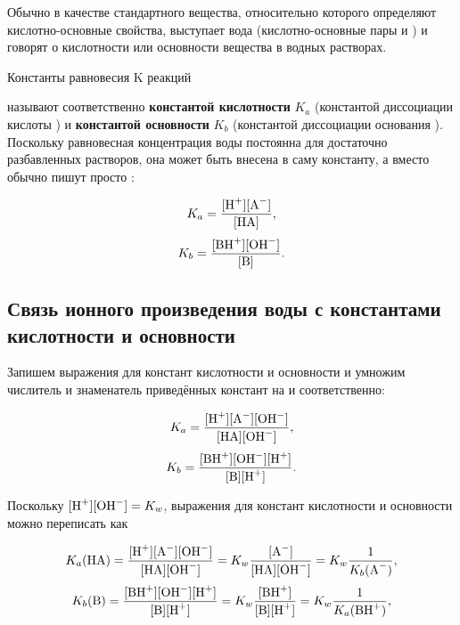Обычно в качестве стандартного вещества, относительно которого определяют кислотно-основные свойства, выступает вода (кислотно-основные пары  и ) и говорят о кислотности или основности вещества в водных растворах.

Константы равновесия K реакций


называют соответственно \textbf{константой кислотности} $K_a$ (константой диссоциации кислоты ) и \textbf{константой основности} $K_b$ (константой диссоциации основания ). Поскольку равновесная концентрация воды \ce{[H2O]} постоянна для достаточно разбавленных растворов, она может быть внесена в саму константу, а вместо  обычно пишут просто :

\begin{equation*}
    K_a = \frac{[\ce{H^+}][\ce{A^-}]}{[\ce{HA}]},
\end{equation*}
\begin{equation*}
    K_b = \frac{[\ce{BH^+}][\ce{OH^-}]}{[\ce{B}]}.
\end{equation*}

\subsection*{Связь ионного произведения воды с константами кислотности и основности}

Запишем выражения для констант кислотности и основности и умножим числитель и знаменатель приведённых констант на \ce{[OH^-]} и \ce{[H^+]} соответственно:

\begin{equation*}
    K_a = \frac{[\ce{H^+}][\ce{A^-}][\ce{OH^-}]}{[\ce{HA}][\ce{OH^-}]},
\end{equation*}
\begin{equation*}
    K_b = \frac{[\ce{BH^+}][\ce{OH^-}][\ce{H^+}]}{[\ce{B}][\ce{H^+}]}.
\end{equation*}

Поскольку $[\ce{H^+}][\ce{OH^-}] = K_w$, выражения для констант кислотности и основности можно переписать как

\begin{equation*}
    K_a(\ce{HA}) = \frac{[\ce{H^+}][\ce{A^-}][\ce{OH^-}]}{[\ce{HA}][\ce{OH^-}]} = K_w\frac{[\ce{A^-}]}{[\ce{HA}][\ce{OH^-}]} = K_w\frac{1}{K_b(\ce{A^-})},
\end{equation*}
\begin{equation*}
    K_b(\ce{B}) = \frac{[\ce{BH^+}][\ce{OH^-}][\ce{H^+}]}{[\ce{B}][\ce{H^+}]} = K_w\frac{[\ce{BH^+}]}{[\ce{B}][\ce{H^+}]} = K_w\frac{1}{K_a(\ce{BH^+})},
\end{equation*}

